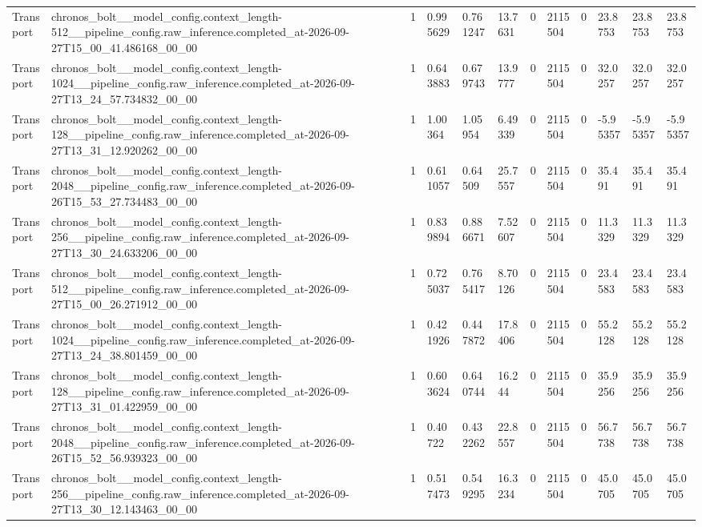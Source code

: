 \begin{tabular}{llllllllllll}
Transport & chronos\_bolt\_\_model\_config.context\_length-512\_\_pipeline\_config.raw\_inference.completed\_at-2026-09-27T15\_00\_41.486168\_00\_00 & 1 & 0.995629 & 0.761247 & 13.7631 & 0 & 2115504 & 0 & 23.8753 & 23.8753 & 23.8753 \\
Transport & chronos\_bolt\_\_model\_config.context\_length-1024\_\_pipeline\_config.raw\_inference.completed\_at-2026-09-27T13\_24\_57.734832\_00\_00 & 1 & 0.643883 & 0.679743 & 13.9777 & 0 & 2115504 & 0 & 32.0257 & 32.0257 & 32.0257 \\
Transport & chronos\_bolt\_\_model\_config.context\_length-128\_\_pipeline\_config.raw\_inference.completed\_at-2026-09-27T13\_31\_12.920262\_00\_00 & 1 & 1.00364 & 1.05954 & 6.49339 & 0 & 2115504 & 0 & -5.95357 & -5.95357 & -5.95357 \\
Transport & chronos\_bolt\_\_model\_config.context\_length-2048\_\_pipeline\_config.raw\_inference.completed\_at-2026-09-26T15\_53\_27.734483\_00\_00 & 1 & 0.611057 & 0.64509 & 25.7557 & 0 & 2115504 & 0 & 35.491 & 35.491 & 35.491 \\
Transport & chronos\_bolt\_\_model\_config.context\_length-256\_\_pipeline\_config.raw\_inference.completed\_at-2026-09-27T13\_30\_24.633206\_00\_00 & 1 & 0.839894 & 0.886671 & 7.52607 & 0 & 2115504 & 0 & 11.3329 & 11.3329 & 11.3329 \\
Transport & chronos\_bolt\_\_model\_config.context\_length-512\_\_pipeline\_config.raw\_inference.completed\_at-2026-09-27T15\_00\_26.271912\_00\_00 & 1 & 0.725037 & 0.765417 & 8.70126 & 0 & 2115504 & 0 & 23.4583 & 23.4583 & 23.4583 \\
Transport & chronos\_bolt\_\_model\_config.context\_length-1024\_\_pipeline\_config.raw\_inference.completed\_at-2026-09-27T13\_24\_38.801459\_00\_00 & 1 & 0.421926 & 0.447872 & 17.8406 & 0 & 2115504 & 0 & 55.2128 & 55.2128 & 55.2128 \\
Transport & chronos\_bolt\_\_model\_config.context\_length-128\_\_pipeline\_config.raw\_inference.completed\_at-2026-09-27T13\_31\_01.422959\_00\_00 & 1 & 0.603624 & 0.640744 & 16.244 & 0 & 2115504 & 0 & 35.9256 & 35.9256 & 35.9256 \\
Transport & chronos\_bolt\_\_model\_config.context\_length-2048\_\_pipeline\_config.raw\_inference.completed\_at-2026-09-26T15\_52\_56.939323\_00\_00 & 1 & 0.40722 & 0.432262 & 22.8557 & 0 & 2115504 & 0 & 56.7738 & 56.7738 & 56.7738 \\
Transport & chronos\_bolt\_\_model\_config.context\_length-256\_\_pipeline\_config.raw\_inference.completed\_at-2026-09-27T13\_30\_12.143463\_00\_00 & 1 & 0.517473 & 0.549295 & 16.3234 & 0 & 2115504 & 0 & 45.0705 & 45.0705 & 45.0705 \\

\end{tabular}
